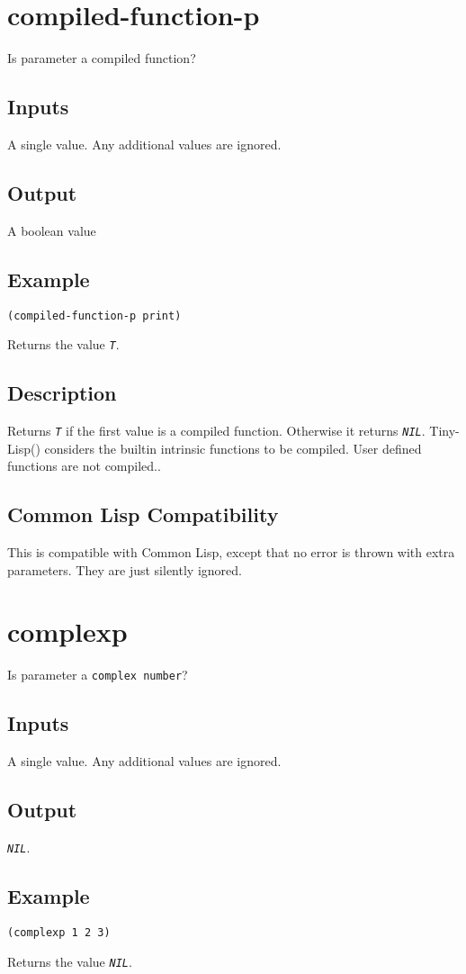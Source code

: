 \documentclass[10pt, openany]{book}
\newcommand{\constant}[1]{\emph{\texttt{#1}}}
\newcommand{\datatype}[1]{\texttt{#1}}
\newcommand{\tl}{Tiny-Lisp}
\newcommand{\cl}{Common Lisp}
\begin{document}
\section{compiled-function-p}
Is parameter a compiled function?
\subsection{Inputs}
A single value.  Any additional values are ignored.
\subsection{Output}
A boolean value
\subsection{Example}
\begin{lstlisting}
(compiled-function-p print)
\end{lstlisting}
Returns the value \constant{T}.
\subsection{Description}
Returns \constant{T} if the first value is a compiled function.  Otherwise it returns \constant{NIL}.  \tl() considers the builtin intrinsic functions to be compiled.  User defined functions are not compiled..
\subsection{Common Lisp Compatibility}
This is compatible with \cl, except that no error is thrown with extra parameters.  They are just silently ignored.

\section{complexp}
Is parameter a \datatype{complex number}?
\subsection{Inputs}
A single value.  Any additional values are ignored.
\subsection{Output}
\constant{NIL}.
\subsection{Example}
\begin{lstlisting}
(complexp 1 2 3)
\end{lstlisting}
Returns the value \constant{NIL}.
\end{document}
